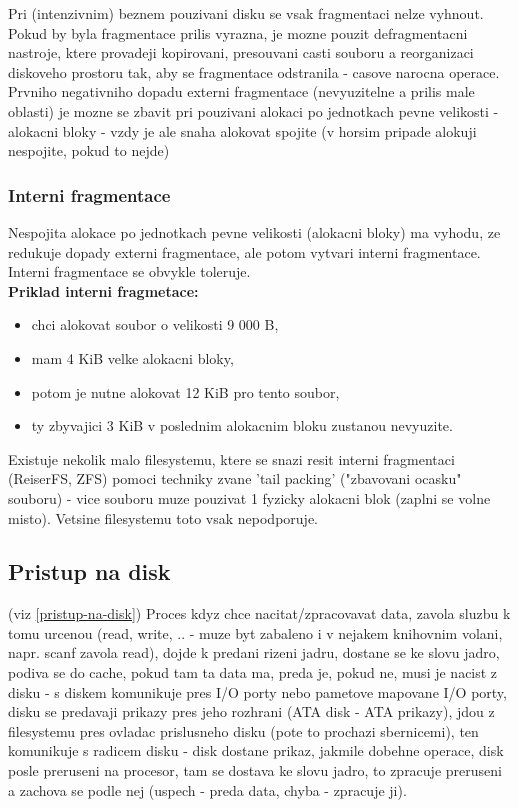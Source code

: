 \documentclass[a4paper, 11pt]{article}
\begin{document}
\noindent Pri (intenzivnim) beznem pouzivani disku se vsak fragmentaci nelze vyhnout. Pokud by byla fragmentace prilis vyrazna, je mozne pouzit defragmentacni nastroje, ktere provadeji kopirovani, presouvani casti souboru a reorganizaci diskoveho prostoru tak, aby se fragmentace odstranila - casove narocna operace. \\

\noindent Prvniho negativniho dopadu externi fragmentace (nevyuzitelne a prilis male oblasti) je mozne se zbavit pri pouzivani alokaci po jednotkach pevne velikosti - alokacni bloky - vzdy je ale snaha alokovat spojite (v horsim pripade alokuji nespojite, pokud to nejde) \\

\subsubsection{Interni fragmentace}
Nespojita alokace po jednotkach pevne velikosti (alokacni bloky) ma vyhodu, ze redukuje dopady externi fragmentace, ale potom vytvari interni fragmentace. Interni fragmentace se obvykle toleruje.  \\

\noindent\textbf{Priklad interni fragmetace:}
\begin{itemize}
    \item chci alokovat soubor o velikosti 9 000 B,
    \item mam 4 KiB velke alokacni bloky,
    \item potom je nutne alokovat 12 KiB pro tento soubor,
    \item ty zbyvajici 3 KiB v poslednim alokacnim bloku zustanou nevyuzite. \\
\end{itemize}

\noindent Existuje nekolik malo filesystemu, ktere se snazi resit interni fragmentaci (ReiserFS, ZFS) pomoci techniky zvane 'tail packing' ("zbavovani ocasku" souboru) - vice souboru muze pouzivat 1 fyzicky alokacni blok (zaplni se volne misto). Vetsine filesystemu toto vsak nepodporuje. \\

\newpage

\subsection{Pristup na disk} \label{pristup-na-disk-detailed}
(viz \ref{pristup-na-disk}) Proces kdyz chce nacitat/zpracovavat data, zavola sluzbu k tomu urcenou (read, write, .. - muze byt zabaleno i v nejakem knihovnim volani, napr. scanf zavola read), dojde k predani rizeni jadru, dostane se ke slovu jadro, podiva se do cache, pokud tam ta data ma, preda je, pokud ne, musi je nacist z disku - s diskem komunikuje pres I/O porty nebo pametove mapovane I/O porty, disku se predavaji prikazy pres jeho rozhrani (ATA disk - ATA prikazy), jdou z filesystemu pres ovladac prislusneho disku (pote to prochazi sbernicemi), ten komunikuje s radicem disku - disk dostane prikaz, jakmile dobehne operace, disk posle preruseni na procesor, tam se dostava ke slovu jadro, to zpracuje preruseni a zachova se podle nej (uspech - preda data, chyba - zpracuje ji). \\
\end{document}
